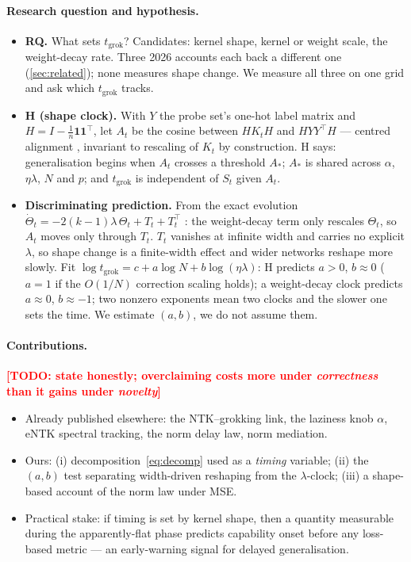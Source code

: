 \documentclass[a4paper,11pt]{article} %
\newcommand{\TODO}[1]{\textcolor{red}{\textbf{[TODO: #1]}}}
\newcommand{\tgrok}{t_{\mathrm{grok}}}
\newcommand{\Astar}{A_{*}}
\begin{document}
\paragraph{Research question and hypothesis.}
\begin{itemize}
	\item \textbf{RQ.} What sets $\tgrok$? Candidates: kernel shape, kernel or
		weight scale, the weight-decay rate. Three 2026 accounts each back a
		different one (\cref{sec:related}); none measures shape change. We measure
		all three on one grid and ask which $\tgrok$ tracks.
	\item \textbf{H (shape clock).} With $Y$ the probe set's one-hot label matrix
		and $H=I-\tfrac1n\mathbf{1}\mathbf{1}^\top$, let $A_t$ be the cosine between
		$HK_tH$ and $HYY^\top H$ --- centred alignment \citep{cortes2012alignment},
		invariant to rescaling of $K_t$ by construction. H says: generalisation
		begins when $A_t$ crosses a threshold $\Astar$; $\Astar$ is shared across
		$\alpha$, $\eta\lambda$, $N$ and $p$; and $\tgrok$ is independent of $S_t$
		given $A_t$.
	\item \textbf{Discriminating prediction.} From the exact evolution
		$\dot\Theta_t=-2(k-1)\lambda\,\Theta_t+T_t+T_t^\top$
		\citep[Eq.~S5, arXiv v1]{lewkowycz2020l2}: the weight-decay term only
		rescales $\Theta_t$, so $A_t$ moves only through $T_t$. $T_t$ vanishes at
		infinite width and carries no explicit $\lambda$, so shape change is a
		finite-width effect and wider networks reshape more slowly. Fit
		$\log\tgrok=c+a\log N+b\log(\eta\lambda)$: H predicts $a>0$, $b\approx0$
		($a=1$ if the $O(1/N)$ correction scaling holds); a weight-decay clock
		predicts $a\approx0$, $b\approx-1$; two nonzero exponents mean two clocks
		and the slower one sets the time. We estimate $(a,b)$, we do not assume them.
\end{itemize}

\paragraph{Contributions.} \TODO{state honestly; overclaiming costs more under
\emph{correctness} than it gains under \emph{novelty}}
\begin{itemize}
	\item Already published elsewhere: the NTK--grokking link, the laziness knob
		$\alpha$, eNTK spectral tracking, the norm delay law, norm mediation.
	\item Ours: (i) decomposition~\eqref{eq:decomp} used as a \emph{timing}
		variable; (ii) the $(a,b)$ test separating width-driven reshaping from the
		$\lambda$-clock; (iii) a shape-based account of the norm law under MSE.
	\item Practical stake: if timing is set by kernel shape, then a quantity
		measurable during the apparently-flat phase predicts capability onset before
		any loss-based metric --- an early-warning signal for delayed generalisation.
\end{itemize}
\end{document}
